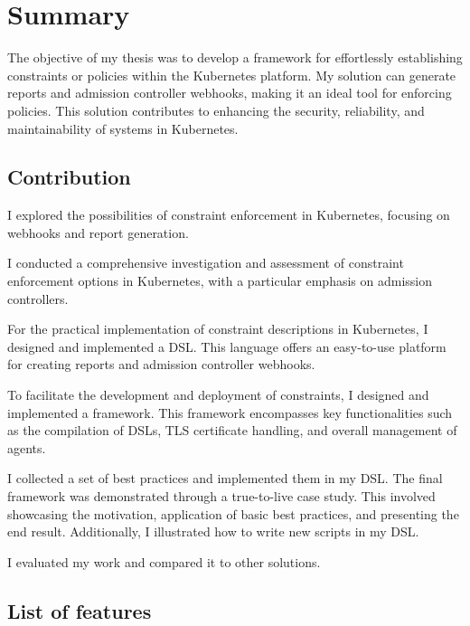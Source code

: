 \setlength{\parindent}{0pt}
\setlength{\parskip}{0.6em}

\chapter{Summary}
\label{chap:summary}

The objective of my thesis was to develop a framework for effortlessly establishing constraints or policies within the Kubernetes platform. My solution can generate reports and admission controller webhooks, making it an ideal tool for enforcing policies. This solution contributes to enhancing the security, reliability, and maintainability of systems in Kubernetes.

\section{Contribution}

I explored the possibilities of constraint enforcement in Kubernetes, focusing on webhooks and report generation.

I conducted a comprehensive investigation and assessment of constraint enforcement options in Kubernetes, with a particular emphasis on admission controllers.

For the practical implementation of constraint descriptions in Kubernetes, I designed and implemented a DSL. This language offers an easy-to-use platform for creating reports and admission controller webhooks.

To facilitate the development and deployment of constraints, I designed and implemented a framework. This framework encompasses key functionalities such as the compilation of DSLs, TLS certificate handling, and overall management of agents.

I collected a set of best practices and implemented them in my DSL.
The final framework was demonstrated through a true-to-live case study. This involved showcasing the motivation, application of basic best practices, and presenting the end result. Additionally, I illustrated how to write new scripts in my DSL.

I evaluated my work and compared it to other solutions.

\clearpage
\section{List of features}

